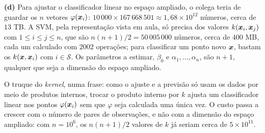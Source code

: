 \documentclass[11pt,a4paper]{article}
\begin{document}
\begin{solucao}
\smallskip
\textbf{(d)} Para ajustar o classificador linear no espaço ampliado, o colega teria de
guardar os $n$ vetores $\varphi(\bm{x}_i)$:
$10\,000\times167\,668\,501\approx1{,}68\times10^{12}$ números, cerca de $13$ TB. A
SVM, pela representação vista em aula, só precisa dos valores $k(\bm{x}_i,\bm{x}_j)$ com
$1\le i\le j\le n$, que são $n(n+1)/2=50\,005\,000$ números, cerca de $400$ MB, cada
um calculado com $2002$ operações; para classificar um ponto novo $\bm{x}$, bastam os
$k(\bm{x},\bm{x}_i)$ com $i\in\mathcal S$. Os parâmetros a estimar, $\beta_0$ e
$\alpha_1,\dots,\alpha_n$, são $n+1$, qualquer que seja a dimensão do espaço ampliado.

O truque do \emph{kernel}, numa frase: como o ajuste e a previsão só usam os dados por
meio de produtos internos, trocar o produto interno por $k$ ajusta um classificador
linear nos pontos $\varphi(\bm{x}_i)$ sem que $\varphi$ seja calculada uma única vez. O
custo passa a crescer com o número de pares de observações, e não com a dimensão do
espaço ampliado: com $n=10^6$, os $n(n+1)/2$ valores de $k$ já seriam cerca de
$5\times10^{11}$.
\end{solucao}
\end{document}

